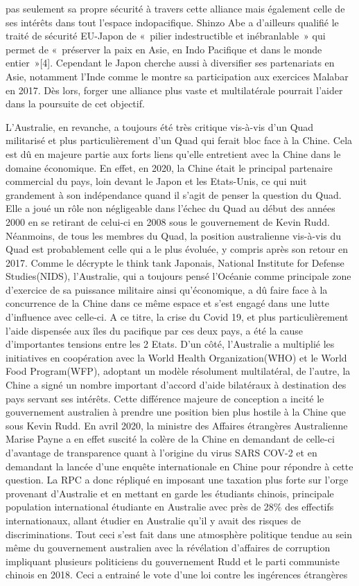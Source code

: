 \documentclass[11pt,a4paper]{article}
\begin{document}
pas seulement sa propre sécurité à travers cette alliance mais également celle de ses intérêts dans tout l'espace indopacifique. Shinzo Abe a d'ailleurs qualifié le traité de sécurité EU-Japon de «~pilier indestructible et inébranlable~» qui permet de «~préserver la paix en Asie, en Indo Pacifique et dans le monde entier~»{[}4{]}. Cependant le Japon cherche aussi à diversifier ses partenariats en Asie, notamment l'Inde comme le montre sa participation aux exercices Malabar en 2017. Dès lors, forger une alliance plus vaste et multilatérale pourrait l'aider dans la poursuite de cet objectif.

L'Australie, en revanche, a toujours été très critique vis-à-vis d'un Quad militarisé et plus particulièrement d'un Quad qui ferait bloc face à la Chine. Cela est dû en majeure partie aux forts liens qu'elle entretient avec la Chine dans le domaine économique. En effet, en 2020, la Chine était le principal partenaire commercial du pays, loin devant le Japon et les Etats-Unis, ce qui nuit grandement à son indépendance quand il s'agit de penser la question du Quad. Elle a joué un rôle non négligeable dans l'échec du Quad au début des années 2000 en se retirant de celui-ci en 2008 sous le gouvernement de Kevin Rudd. Néanmoins, de tous les membres du Quad, la position australienne vis-à-vis du Quad est probablement celle qui a le plus évoluée, y compris après son retour en 2017. Comme le décrypte le think tank Japonais, National Institute for Defense Studies(NIDS), l'Australie, qui a toujours pensé l'Océanie comme principale zone d'exercice de sa puissance militaire ainsi qu'économique, a dû faire face à la concurrence de la Chine dans ce même espace et s'est engagé dans une lutte d'influence avec celle-ci. A ce titre, la crise du Covid 19, et plus particulièrement l'aide dispensée aux îles du pacifique par ces deux pays, a été la cause d'importantes tensions entre les 2 Etats. D'un côté, l'Australie a multiplié les initiatives en coopération avec la World Health Organization(WHO) et le World Food Program(WFP), adoptant un modèle résolument multilatéral, de l'autre, la Chine a signé un nombre important d'accord d'aide bilatéraux à destination des pays servant ses intérêts. Cette différence majeure de conception a incité le gouvernement australien à prendre une position bien plus hostile à la Chine que sous Kevin Rudd. En avril 2020, la ministre des Affaires étrangères Australienne Marise Payne a en effet suscité la colère de la Chine en demandant de celle-ci d'avantage de transparence quant à l'origine du virus SARS COV-2 et en demandant la lancée d'une enquête internationale en Chine pour répondre à cette question. La RPC a donc répliqué en imposant une taxation plus forte sur l'orge provenant d'Australie et en mettant en garde les étudiants chinois, principale population international étudiante en Australie avec près de 28\% des effectifs internationaux, allant étudier en Australie qu'il y avait des risques de discriminations. Tout ceci s'est fait dans une atmosphère politique tendue au sein même du gouvernement australien avec la révélation d'affaires de corruption impliquant plusieurs politiciens du gouvernement Rudd et le parti communiste chinois en 2018. Ceci a entrainé le vote d'une loi contre les ingérences étrangères 
\end{document}

